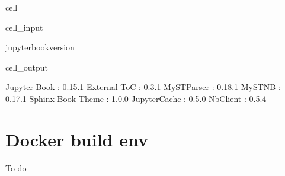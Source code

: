 \documentclass[letterpaper,table,10pt,english]{jupyterBook}
\begin{document}
\begin{sphinxuseclass}{cell}\begin{sphinxVerbatimInput}

\begin{sphinxuseclass}{cell_input}
\begin{sphinxVerbatim}[commandchars=\\\{\}]
jupyter\PYGZhy{}book\PYGZhy{}\PYGZhy{}version
\end{sphinxVerbatim}

\end{sphinxuseclass}\end{sphinxVerbatimInput}
\begin{sphinxVerbatimOutput}

\begin{sphinxuseclass}{cell_output}
\begin{sphinxVerbatim}[commandchars=\\\{\}]
Jupyter Book      : 0.15.1
External ToC      : 0.3.1
MyST\PYGZhy{}Parser       : 0.18.1
MyST\PYGZhy{}NB           : 0.17.1
Sphinx Book Theme : 1.0.0
Jupyter\PYGZhy{}Cache     : 0.5.0
NbClient          : 0.5.4
\end{sphinxVerbatim}

\end{sphinxuseclass}\end{sphinxVerbatimOutput}

\end{sphinxuseclass}

\section{Docker build env}
\label{\detokenize{tests/build_versions_checks:docker-build-env}}
\sphinxAtStartPar
To do
\end{document}
